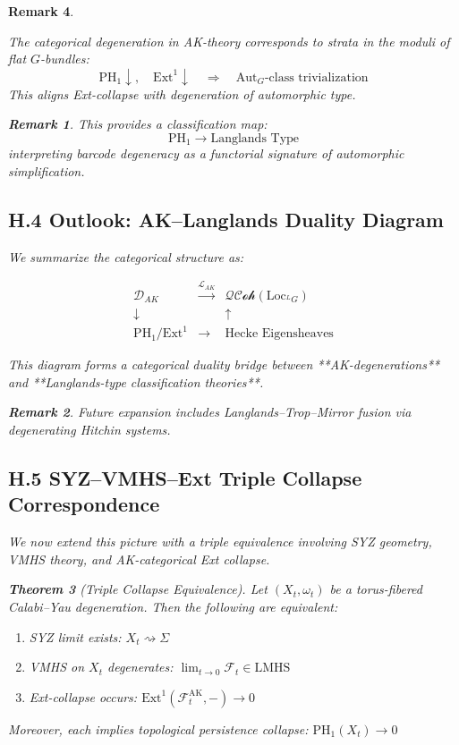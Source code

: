 \documentclass[11pt]{article}
\newtheorem{theorem}{Theorem}[section]
\newtheorem{remark}[theorem]{Remark}
\begin{document}
\begin{remark}
\begin{proposition}
The categorical degeneration in AK-theory corresponds to strata in the moduli of flat \( G \)-bundles:
\[
\text{PH}_1 \downarrow,\quad \mathrm{Ext}^1 \downarrow \quad \Rightarrow \quad \mathrm{Aut}_G\text{-class trivialization}
\]
This aligns Ext-collapse with degeneration of automorphic type.
\end{proposition}

\begin{remark}
This provides a classification map:
\[
\mathrm{PH}_1 \to \text{Langlands Type}
\]
interpreting barcode degeneracy as a functorial signature of automorphic simplification.
\end{remark}

\subsection*{H.4 Outlook: AK–Langlands Duality Diagram}

We summarize the categorical structure as:

\[
\begin{array}{ccc}
\mathcal{D}_{AK} & \xrightarrow{\mathcal{L}_{AK}} & \mathcal{QCoh}(\mathrm{Loc}_{^LG}) \\
\downarrow & & \uparrow \\
\mathrm{PH}_1 / \mathrm{Ext}^1 & \longrightarrow & \text{Hecke Eigensheaves}
\end{array}
\]

This diagram forms a categorical duality bridge  
between **AK-degenerations** and **Langlands-type classification theories**.

\begin{remark}
Future expansion includes Langlands–Trop–Mirror fusion via degenerating Hitchin systems.
\end{remark}


\subsection*{H.5 SYZ–VMHS–Ext Triple Collapse Correspondence}

We now extend this picture with a triple equivalence involving SYZ geometry, VMHS theory, and AK-categorical Ext collapse.

\begin{theorem}[Triple Collapse Equivalence]
Let $(X_t, \omega_t)$ be a torus-fibered Calabi–Yau degeneration. Then the following are equivalent:
\begin{enumerate}
    \item SYZ limit exists: $X_t \rightsquigarrow \Sigma$
    \item VMHS on $X_t$ degenerates: $\lim_{t \to 0} \mathcal{F}_t \in \mathrm{LMHS}$
    \item Ext-collapse occurs: $\mathrm{Ext}^1(\mathcal{F}_t^{\mathrm{AK}}, -) \to 0$
\end{enumerate}
Moreover, each implies topological persistence collapse: $\mathrm{PH}_1(X_t) \to 0$
\end{theorem}


\end{remark}
\end{document}
